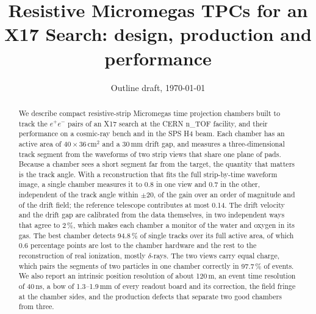 \documentclass[11pt,a4paper]{article}
\title{Resistive Micromegas TPCs for an X17 Search: design, production and performance}
\author{\tbw{author list -- undecided (C4)}}
\date{Outline draft, \today}
\begin{document}
\maketitle

\begin{abstract}
We describe compact resistive-strip Micromegas time projection chambers built to track the $e^+e^-$ pairs of an X17
search at the CERN n\_TOF facility, and their performance on a cosmic-ray bench and in the SPS H4 beam. Each chamber
has an active area of $40\times36$\,cm$^2$ and a 30\,mm drift gap, and measures a three-dimensional track segment
from the waveforms of two strip views that share one plane of pads. Because a chamber sees a short segment far from
the target, the quantity that matters is the track angle. With a reconstruction that fits the full
strip-by-time waveform image, a single chamber measures it to 0.8\textdegree{} in one view and 0.7\textdegree{} in
the other, independent of the track angle within $\pm20$\textdegree, of the gain over an order of magnitude and of the
drift field; the reference telescope contributes at most 0.14\textdegree. The drift velocity and the drift gap are
calibrated from the data themselves, in two independent ways that agree to 2\,\%, which makes each chamber a monitor
of the water and oxygen in its gas. The best chamber detects 94.8\,\% of single tracks over its full active area, of
which 0.6 percentage points are lost to the chamber hardware and the rest to the reconstruction of real ionization,
mostly $\delta$-rays. The two views carry equal charge, which pairs the segments of two particles in one chamber
correctly in 97.7\,\% of events. We also report an intrinsic position resolution of about 120\,\textmu m, an event
time resolution of 40\,ns, a bow of 1.3--1.9\,mm of every readout board and its correction, the field fringe at the
chamber sides, and the production defects that separate two good chambers from three.
\end{abstract}

\ifdraftnotes
{}
\clearpage
\tableofcontents
\clearpage
\fi












\end{document}

